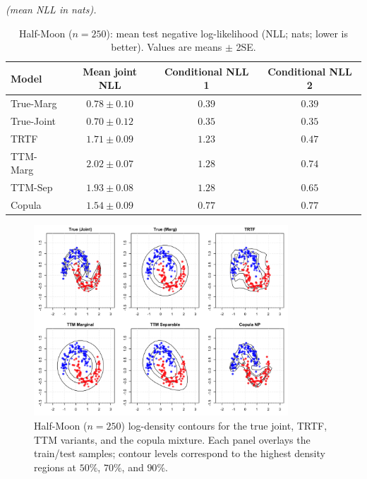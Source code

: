 \documentclass[11pt,a4paper,twoside]{book}\usepackage[]{graphicx}\usepackage[]{xcolor}
\begin{document}
\begin{table}[htbp]
  \centering
  \textit{(mean NLL in nats).}
  \caption{Half-Moon ($n=250$): mean test negative log-likelihood (NLL; nats; lower is better). Values are means $\pm$ 2SE.}
  \label{tab:halfmoon-nll}
  \begin{tabular}{lccc}
    \hline
    Model & Mean joint NLL & Conditional NLL 1 & Conditional NLL 2 \\
    \hline
    True-Marg      & $0.78 \pm 0.10$ & $0.39$ & $0.39$ \\
    True-Joint     & $0.70 \pm 0.12$ & $0.35$ & $0.35$ \\
    TRTF             & $1.71 \pm 0.09$ & $1.23$ & $0.47$ \\
    TTM-Marg         & $2.02 \pm 0.07$ & $1.28$ & $0.74$ \\
    TTM-Sep          & $1.93 \pm 0.08$ & $1.28$ & $0.65$ \\
    Copula           & $1.54 \pm 0.09$ & $0.77$ & $0.77$ \\
    \hline
  \end{tabular}
\end{table}

\begin{figure}[htbp]
  \centering
  \includegraphics[width=0.85\textwidth]{figure/halfmoon_panels_seed007_N250.png}
  \caption{Half-Moon ($n=250$) log-density contours for the true joint, TRTF, TTM variants, and the copula mixture. Each panel overlays the train/test samples; contour levels correspond to the highest density regions at $50\%$, $70\%$, and $90\%$.}
  \label{fig:halfmoon-panels}
\end{figure}
\end{document}
